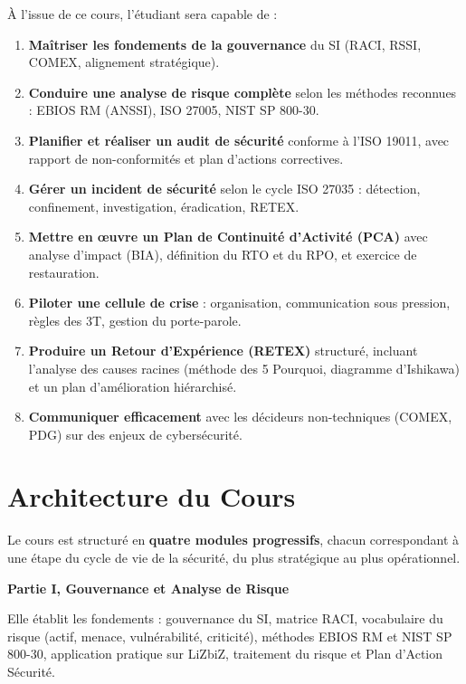 \begin{boxobjectifs}
À l'issue de ce cours, l'étudiant sera capable de :
\begin{enumerate}
    \item \textbf{Maîtriser les fondements de la gouvernance} du SI (RACI, RSSI, COMEX, alignement stratégique).
    \item \textbf{Conduire une analyse de risque complète} selon les méthodes reconnues : EBIOS RM (ANSSI), ISO 27005, NIST SP 800-30.
    \item \textbf{Planifier et réaliser un audit de sécurité} conforme à l'ISO 19011, avec rapport de non-conformités et plan d'actions correctives.
    \item \textbf{Gérer un incident de sécurité} selon le cycle ISO 27035 : détection, confinement, investigation, éradication, RETEX.
    \item \textbf{Mettre en œuvre un Plan de Continuité d'Activité (PCA)} avec analyse d'impact (BIA), définition du RTO et du RPO, et exercice de restauration.
    \item \textbf{Piloter une cellule de crise} : organisation, communication sous pression, règles des 3T, gestion du porte-parole.
    \item \textbf{Produire un Retour d'Expérience (RETEX)} structuré, incluant l'analyse des causes racines (méthode des 5 Pourquoi, diagramme d'Ishikawa) et un plan d'amélioration hiérarchisé.
    \item \textbf{Communiquer efficacement} avec les décideurs non-techniques (COMEX, PDG) sur des enjeux de cybersécurité.
\end{enumerate}
\end{boxobjectifs}

\section*{Architecture du Cours}

Le cours est structuré en \textbf{quatre modules progressifs}, chacun correspondant à une étape du cycle de vie de la sécurité, du plus stratégique au plus opérationnel.

\medskip
\noindent\textbf{Partie I, Gouvernance et Analyse de Risque}

Elle établit les fondements : gouvernance du SI, matrice RACI, vocabulaire du risque (actif, menace, vulnérabilité, criticité), méthodes EBIOS RM et NIST SP 800-30, application pratique sur LiZbiZ, traitement du risque et Plan d'Action Sécurité.

